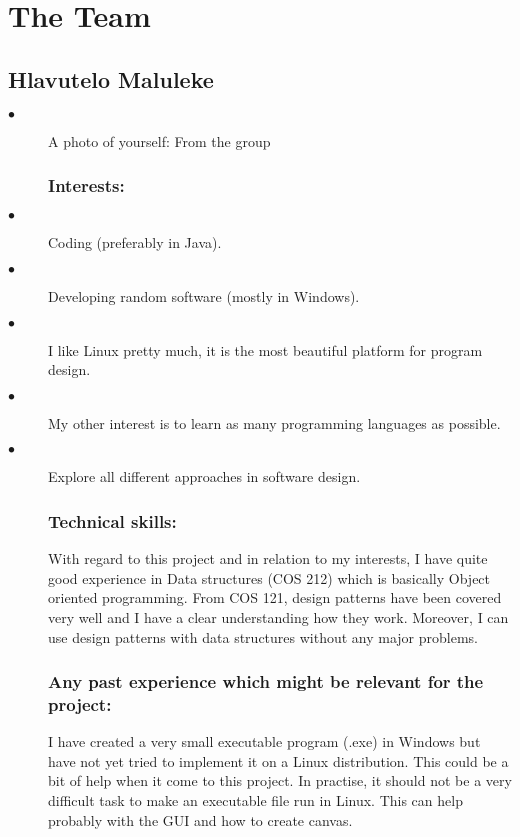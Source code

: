 \documentclass[12pt]{article}
\begin{document}


\newpage


\pagebreak

\section{The Team}

\subsection{Hlavutelo Maluleke}

\begin{description}
  \item[$\bullet$] A photo of yourself: From the group
  \subsubsection{Interests:}
  \item[$\bullet$] Coding (preferably in Java).
  \item[$\bullet$] Developing random software (mostly in Windows).
  \item[$\bullet$] I like Linux pretty much, it is the most beautiful platform for program design.
  \item[$\bullet$] My other interest is to learn as many programming languages as possible.
  \item[$\bullet$] Explore all different approaches in software design.
  
  \subsubsection{Technical skills:}
  
  With regard to this project and in relation to my interests, I have quite good experience in Data structures (COS 212) which is basically Object oriented programming. From COS 121, design patterns have been covered very well and I have a clear understanding how they work. Moreover, I can use design patterns with data structures without any major problems.
  
  \subsubsection{Any past experience which might be relevant for the project:}
  
  I have created a very small executable program (.exe) in Windows but have not yet tried to implement it on a Linux distribution. This could be a bit of help when it come to this project. In practise, it should not be a very difficult task to make an executable file run in Linux. This can help probably with the GUI and how to create canvas.


\end{description}
\end{document}
